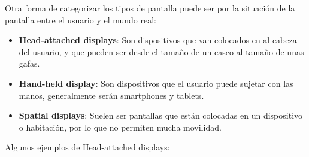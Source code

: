 \newpage

\begin{flushleft}
Otra forma de categorizar los tipos de pantalla puede ser por la situación de la pantalla entre el usuario y el mundo real:
\end{flushleft}

\begin{itemize}
  \item \textbf{Head-attached displays}: Son dispositivos que van colocados en al cabeza del usuario, y que pueden ser desde el tamaño de un casco al tamaño de unas gafas.

  \item \textbf{Hand-held display}: Son dispositivos que el usuario puede sujetar con las manos, generalmente serán smartphones y tablets.

  \item \textbf{Spatial displays}: Suelen ser pantallas que están colocadas en un dispositivo o habitación, por lo que no permiten mucha movilidad.

\end{itemize}

\begin{flushleft}
Algunos ejemplos de Head-attached displays:
\end{flushleft}

